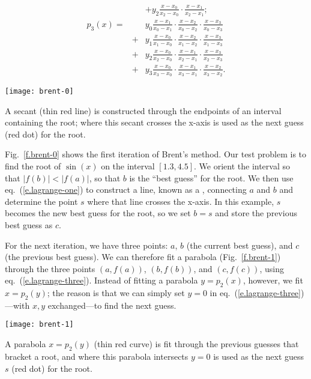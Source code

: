 \begin{sidebar}[Interpolation]
\begin{eqnarray}
	&&+ y_{2}\frac{x-x_{0}}{x_{2}-x_{0}}\cdot\frac{x-x_{1}}{x_{2}-x_{1}};\\
\label{e.lagrange-four}
p_{3}(x) =&&  y_{0}\frac{x-x_{1}}{x_{0}-x_{1}}\cdot\frac{x-x_{2}}{x_{0}-x_{2}}\cdot\frac{x-x_{3}}{x_{0}-x_{3}} \nonumber\\
      &+& y_{1}\frac{x-x_{0}}{x_{1}-x_{0}}\cdot\frac{x-x_{2}}{x_{1}-x_{2}}\cdot\frac{x-x_{3}}{x_{1}-x_{3}} \nonumber \\
      &+& y_{2}\frac{x-x_{0}}{x_{2}-x_{0}}\cdot\frac{x-x_{1}}{x_{2}-x_{1}}\cdot\frac{x-x_{3}}{x_{2}-x_{3}} \nonumber\\
      &+& y_{3}\frac{x-x_{0}}{x_{3}-x_{0}}\cdot\frac{x-x_{1}}{x_{3}-x_{1}}\cdot\frac{x-x_{2}}{x_{3}-x_{2}}.
\end{eqnarray}
\end{sidebar}

\begin{marginfigure}[-12\baselineskip]
\texttt{[image: brent-0]}
\caption[Brent's method]{A secant (thin red line) is constructed through the endpoints of an interval containing the root; where this secant crosses the x-axis is used as the next guess (red dot) for the root.\label{f.brent-0}}
\end{marginfigure}
Fig.~\ref{f.brent-0} shows the first iteration of Brent's method. Our test problem is to find the root of $\sin(x)$ on the interval $[1.3,4.5]$. We orient the interval so that $|f(b)|<|f(a)|$, so that $b$ is the ``best guess'' for the root. We then use eq.~(\ref{e.lagrange-one}) to construct a line, known as a , connecting $a$ and $b$ and determine the point $s$ where that line crosses the x-axis. In this example, $s$ becomes the new best guess for the root, so we set $b=s$ and store the previous best guess as $c$.

For the next iteration, we have three points: $a$, $b$ (the current best guess), and $c$ (the previous best guess). We can therefore fit a parabola (Fig.~\ref{f.brent-1}) through the three points $(a,f(a))$, $(b,f(b))$, and $(c,f(c))$, using eq.~(\ref{e.lagrange-three}). Instead of fitting a parabola $y = p_{2}(x)$, however, we fit $x = p_{2}(y)$; the reason is that we can simply set $y=0$ in eq.~(\ref{e.lagrange-three})---with $x,y$ exchanged---to find the next guess.
\begin{marginfigure}[-8\baselineskip]
\texttt{[image: brent-1]}
\caption[Second iteration, Brent's method]{A parabola $x=p_{2}(y)$ (thin red curve) is fit through the previous guesses that bracket a root, and where this parabola intersects $y=0$ is used as the next guess $s$ (red dot) for the root.\label{f.brent-1}}
\end{marginfigure}

